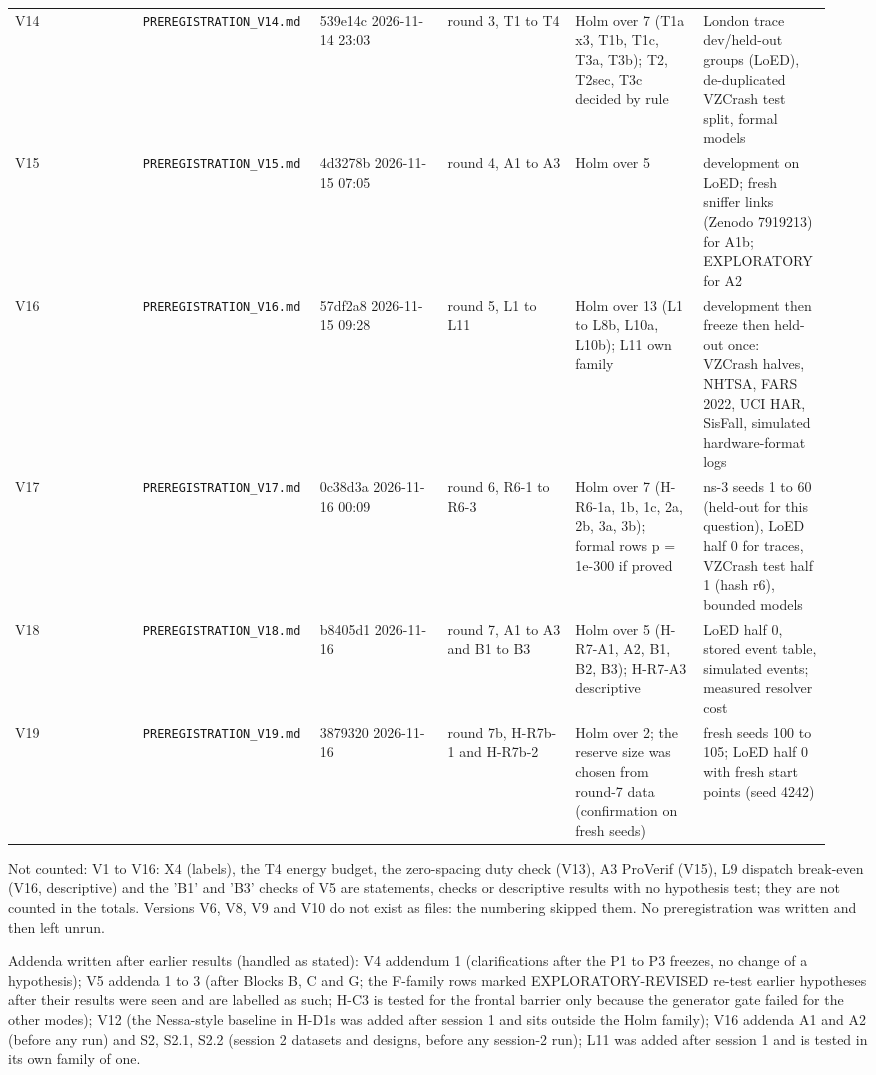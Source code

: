 {\begin{longtable}{p{0.158\linewidth}p{0.158\linewidth}p{0.158\linewidth}p{0.158\linewidth}p{0.158\linewidth}p{0.158\linewidth}}
V14 & \texttt{PREREGISTRATION\_V14.md} & 539e14c 2026-11-14 23:03 & round 3, T1 to T4 & Holm over 7 (T1a x3, T1b, T1c, T3a, T3b); T2, T2sec, T3c decided by rule & London trace dev/held-out groups (LoED), de-duplicated VZCrash test split, formal models \\
V15 & \texttt{PREREGISTRATION\_V15.md} & 4d3278b 2026-11-15 07:05 & round 4, A1 to A3 & Holm over 5 & development on LoED; fresh sniffer links (Zenodo 7919213) for A1b; EXPLORATORY for A2 \\
V16 & \texttt{PREREGISTRATION\_V16.md} & 57df2a8 2026-11-15 09:28 & round 5, L1 to L11 & Holm over 13 (L1 to L8b, L10a, L10b); L11 own family & development then freeze then held-out once: VZCrash halves, NHTSA, FARS 2022, UCI HAR, SisFall, simulated hardware-format logs \\
V17 & \texttt{PREREGISTRATION\_V17.md} & 0c38d3a 2026-11-16 00:09 & round 6, R6-1 to R6-3 & Holm over 7 (H-R6-1a, 1b, 1c, 2a, 2b, 3a, 3b); formal rows p = 1e-300 if proved & ns-3 seeds 1 to 60 (held-out for this question), LoED half 0 for traces, VZCrash test half 1 (hash r6), bounded models \\
V18 & \texttt{PREREGISTRATION\_V18.md} & b8405d1 2026-11-16 & round 7, A1 to A3 and B1 to B3 & Holm over 5 (H-R7-A1, A2, B1, B2, B3); H-R7-A3 descriptive & LoED half 0, stored event table, simulated events; measured resolver cost \\
V19 & \texttt{PREREGISTRATION\_V19.md} & 3879320 2026-11-16 & round 7b, H-R7b-1 and H-R7b-2 & Holm over 2; the reserve size was chosen from round-7 data (confirmation on fresh seeds) & fresh seeds 100 to 105; LoED half 0 with fresh start points (seed 4242) \\
\bottomrule
\end{longtable}}

Not counted: V1 to V16: X4 (labels), the T4 energy budget, the zero-spacing duty check (V13), A3 ProVerif (V15), L9 dispatch break-even (V16, descriptive) and the 'B1' and 'B3' checks of V5 are statements, checks or descriptive results with no hypothesis test; they are not counted in the totals. Versions V6, V8, V9 and V10 do not exist as files: the numbering skipped them. No preregistration was written and then left unrun.

Addenda written after earlier results (handled as stated): V4 addendum 1 (clarifications after the P1 to P3 freezes, no change of a hypothesis); V5 addenda 1 to 3 (after Blocks B, C and G; the F-family rows marked EXPLORATORY-REVISED re-test earlier hypotheses after their results were seen and are labelled as such; H-C3 is tested for the frontal barrier only because the generator gate failed for the other modes); V12 (the Nessa-style baseline in H-D1s was added after session 1 and sits outside the Holm family); V16 addenda A1 and A2 (before any run) and S2, S2.1, S2.2 (session 2 datasets and designs, before any session-2 run); L11 was added after session 1 and is tested in its own family of one.

